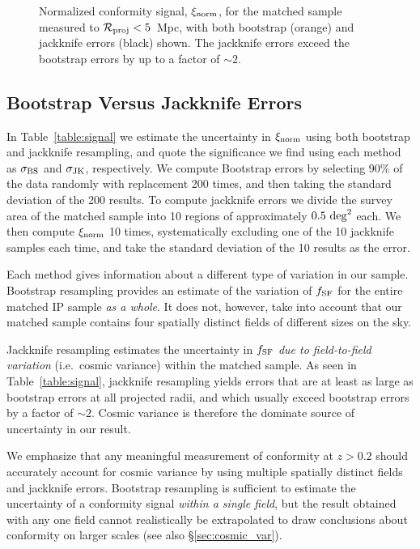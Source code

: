 \begin{figure}
  \epstrim{0.3in 0.1in 0.2in 0.3in}
  \caption{Normalized conformity signal, $\signorm$, for the matched sample measured to ${\mathcal{R}_{\text{proj}}<5}$~Mpc, with both bootstrap (orange) and jackknife errors (black) shown.  The jackknife errors exceed the bootstrap errors by up to a factor of $\sim2$.
}
  \label{fig:normsig_matched}
\end{figure}


\subsection{Bootstrap Versus Jackknife Errors}\label{sec:errors}

In Table~\ref{table:signal} we estimate the uncertainty in $\signorm$ using both bootstrap and jackknife resampling, and quote the significance we find using each 
method as $\sigmaBS$ and $\sigmaJK$, respectively.
We compute Bootstrap errors by selecting 90\% of the data randomly with replacement 200 times, and then taking the standard deviation of the 200 results.
To compute jackknife errors we divide the survey area of the matched sample into 10 regions of approximately $0.5~\degsq$ each.
We then compute $\signorm$ 10 times, systematically excluding one of the 10 jackknife samples each time, and take the standard deviation of the 10 results as the error.

Each method gives information about a different type of variation in our sample.
Bootstrap resampling provides an estimate of the variation of $\flate$ for the entire matched IP sample \emph{as a whole}.
It does not, however, take into account that our matched sample contains four spatially distinct fields of different sizes on the sky.

Jackknife resampling estimates the uncertainty in $\flate$ \emph{due to field-to-field variation} (i.e.~cosmic variance) within the matched sample.
As seen in Table~\ref{table:signal}, jackknife resampling yields errors that are at least as large as bootstrap errors at all projected radii,
and which usually exceed bootstrap errors by a factor of $\sim2$.
Cosmic variance is therefore the dominate source of uncertainty in our result.

We emphasize that any meaningful measurement of conformity at $z>0.2$ should accurately account for cosmic variance by using multiple spatially distinct fields and jackknife errors.
Bootstrap resampling is sufficient to estimate the uncertainty of a conformity signal \emph{within a single field}, but the result obtained with any one field cannot
realistically be extrapolated to draw conclusions about conformity on larger scales (see also \S\ref{sec:cosmic_var}).

